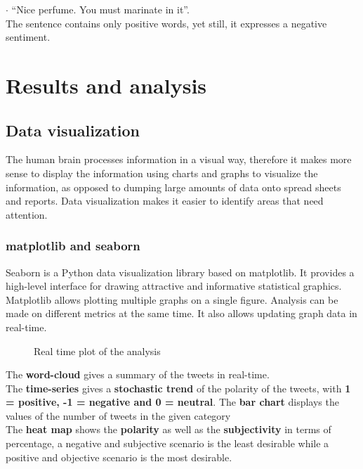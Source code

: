 $\cdot$ “Nice perfume. You must marinate in it”.\\
The sentence contains only positive words, yet still, it expresses a negative sentiment.






\chapter{Results and analysis}\label{ch:Results}

\section{Data visualization}

The human brain processes information in a visual way, therefore it makes more sense to display the information using charts and graphs to visualize the information, as opposed to dumping large amounts of data onto spread sheets and reports. Data visualization makes it easier to identify areas that need attention.

\subsection{matplotlib and seaborn}

Seaborn is a Python data visualization library based on matplotlib. It provides a high-level interface for drawing attractive and informative statistical graphics.
Matplotlib allows plotting multiple graphs on a single figure. Analysis can be made on different metrics at the same time. It also allows updating graph data in real-time.

\begin{figure}[h]
  \centering
  \caption[Real time plot of the analysis]
  {Real time plot of the analysis}
  \label{fig:ALAP:sm1}
\end{figure}


The \textbf{word-cloud} gives a summary of the tweets in real-time.\\
The \textbf{time-series} gives a \textbf{stochastic trend} of the polarity of the tweets, with \textbf{1 = positive, -1 = negative and 0 = neutral}.
The \textbf{bar chart} displays the values of the number of tweets in the given category\\
The \textbf{heat map} shows the \textbf{polarity} as well as the \textbf{subjectivity} in terms of percentage,
a negative and subjective scenario is the least desirable while a positive and objective scenario is the most desirable.\\

